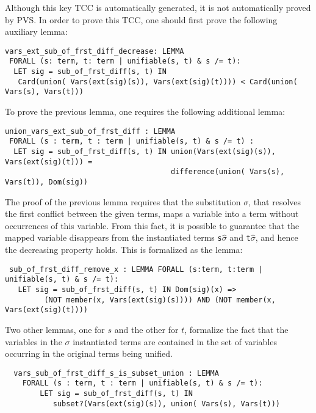 \documentclass[submission,copyright,creativecommons]{eptcs}
\begin{document}
  Although this key TCC is automatically generated, it is not
  automatically proved by PVS. In order to prove this TCC, one should
  first prove the following auxiliary lemma:

  {\small
\begin{verbatim}
vars_ext_sub_of_frst_diff_decrease: LEMMA
 FORALL (s: term, t: term | unifiable(s, t) & s /= t):
  LET sig = sub_of_frst_diff(s, t) IN
   Card(union( Vars(ext(sig)(s)), Vars(ext(sig)(t)))) < Card(union( Vars(s), Vars(t)))
\end{verbatim}
  }

  To prove the previous lemma, one requires the following additional
  lemma:

  {\small
\begin{verbatim}
union_vars_ext_sub_of_frst_diff : LEMMA
 FORALL (s : term, t : term | unifiable(s, t) & s /= t) :
  LET sig = sub_of_frst_diff(s, t) IN union(Vars(ext(sig)(s)), Vars(ext(sig)(t))) = 
                                      difference(union( Vars(s), Vars(t)), Dom(sig))
\end{verbatim}
  }

  The proof of the previous lemma requires that the substitution
  $\sigma$, that resolves the first conflict between the given terms,
  maps a variable into a term without occurrences of this variable.
  From this fact, it is possible to guarantee that the mapped variable
  disappears from the instantiated terms {\tt s$\hat{\sigma}$} and
  {\tt t$\hat{\sigma}$}, and hence the decreasing property holds. This
  is formalized as the lemma:

  {\small
\begin{verbatim}
 sub_of_frst_diff_remove_x : LEMMA FORALL (s:term, t:term | unifiable(s, t) & s /= t):
   LET sig = sub_of_frst_diff(s, t) IN Dom(sig)(x) =>  
         (NOT member(x, Vars(ext(sig)(s)))) AND (NOT member(x, Vars(ext(sig)(t))))
\end{verbatim}
  }

  Two other lemmas, one for $s$ and the other for $t$, formalize the
  fact that the variables in the $\sigma$ instantiated terms are
  contained in the set of variables occurring in the original terms
  being unified.

  {\small
\begin{verbatim}
  vars_sub_of_frst_diff_s_is_subset_union : LEMMA
    FORALL (s : term, t : term | unifiable(s, t) & s /= t):
        LET sig = sub_of_frst_diff(s, t) IN
           subset?(Vars(ext(sig)(s)), union( Vars(s), Vars(t)))
\end{verbatim}
  }
\end{document}
